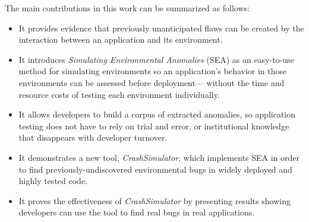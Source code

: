 The main contributions in this work can be summarized as follows:

\begin{itemize}

\item{It provides evidence
that previously unanticipated flaws can be created by the interaction
between an application and its environment.}

\item{It introduces \textit{Simulating Environmental Anomalies} (SEA)
as an easy-to-use method for simulating environments
so an application's behavior in those environments
can be assessed before deployment---
without the time and resource costs of
testing each environment individually.}

\item{It allows developers to build a corpus of extracted anomalies, so
    application testing does not have to rely on trial and error,
    or institutional knowledge
    that disappears with developer turnover.}

\item{It demonstrates a new tool, {\em CrashSimulator},
which implements SEA
in order to find previously-undiscovered environmental bugs
in widely deployed and highly tested code.}

\item{It proves the effectiveness
of {\em CrashSimulator}
by presenting results
showing developers
can use the tool to find real bugs in real applications.}

\end{itemize}
